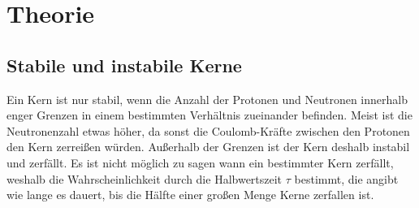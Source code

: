 \section{Theorie}
\label{sec:Theorie}

\subsection{Stabile und instabile Kerne}
Ein Kern ist nur stabil, wenn die Anzahl der Protonen und Neutronen innerhalb enger Grenzen in einem bestimmten Verhältnis zueinander befinden. Meist ist die Neutronenzahl etwas höher, da sonst die Coulomb-Kräfte zwischen den Protonen den Kern zerreißen würden. Außerhalb der Grenzen ist der Kern deshalb instabil und zerfällt.
Es ist nicht möglich zu sagen wann ein bestimmter Kern zerfällt, weshalb die Wahrscheinlichkeit durch die Halbwertszeit $\tau$ bestimmt, die angibt wie lange es dauert, bis die Hälfte einer großen Menge Kerne zerfallen ist.

